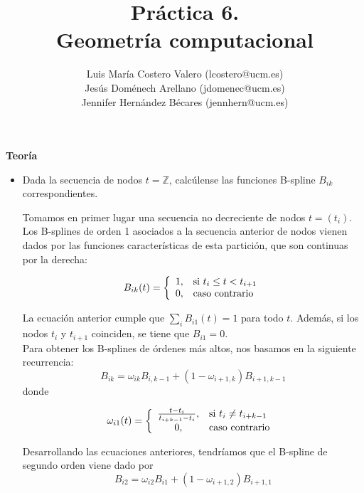 \documentclass[12pt,a4paper]{article}
\title{Práctica 6. \\ Geometría computacional}
\author{Luis María Costero Valero (lcostero@ucm.es)\\ Jesús Doménech
  Arellano (jdomenec@ucm.es) \\ Jennifer Hernández Bécares (jennhern@ucm.es)}
\date{}
\begin{document}
\maketitle
\onehalfspace

\begin{center}
  {\large \textbf{Teoría}}
\end{center}
\begin{itemize}
\item Dada la secuencia de nodos $t=\mathbb{Z}$, calcúlense las
  funciones B-spline $B_{ik}$ correspondientes.

  Tomamos en primer lugar una secuencia no decreciente de nodos
  $t=(t_i)$. Los B-splines de orden 1 asociados a la secuencia
  anterior de nodos vienen dados por las funciones características de
  esta partición, que son continuas por la derecha:
  
  \begin{equation}
    B_{ik}(t)=
    \left\lbrace
    \begin{array}{c l}
      1, & $si $t_i\le t<t_{i+1}\\
      0, & $caso contrario $ \\
    \end{array}
    \right.
  \end{equation}

  La ecuación anterior cumple que $\sum_{i}B_{i1}(t)=1$ para todo $t$. Además, si los nodos $t_i$ y $t_{i+1}$ coinciden, se tiene que $B_{i1}=0$. \\

  Para obtener los B-splines de órdenes más altos, nos basamos en la siguiente recurrencia:
  \begin{equation}
    B_{ik}=\omega_{ik}B_{i,k-1}+(1-\omega_{i+1,k})B_{i+1,k-1}
  \end{equation}
  donde
      
  \begin{equation}
    \omega_{i1}(t)=
    \left\lbrace
    \begin{array}{c l}
      \frac{t-t_i}{t_{i+k-1}-t_i}, & $si $t_i\neq t_{i+k-1}\\
      0, & $caso contrario $ \\
    \end{array}
    \right.
  \end{equation}

  Desarrollando las ecuaciones anteriores, tendríamos que el B-spline
  de segundo orden viene dado por
  \begin{equation}
    B_{i2}=\omega_{i2}B_{i1}+(1-\omega_{i+1,2})B_{i+1,1}
  \end{equation}


\end{itemize}
\end{document}
